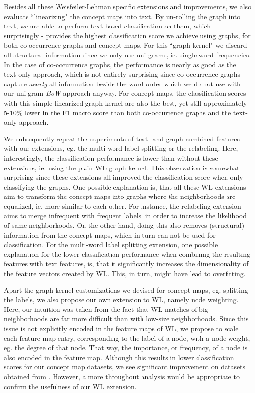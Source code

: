 Besides all these Weisfeiler-Lehman specific extensions and improvements, we also evaluate ``linearizing" the concept maps into text.
By un-rolling the graph into text, we are able to perform text-based classification on them, which - surprisingly - provides the highest classification score we achieve using graphs, for both co-occurrence graphs and concept maps.
For this ``graph kernel" we discard all structural information since we only use uni-grams, ie. single word frequencies.
In the case of co-occurrence graphs, the performance is nearly as good as the text-only approach, which is not entirely surprising since co-occurrence graphs capture \textit{nearly} all information beside the word order which we do not use with our uni-gram \textit{BoW} approach anyway.
For concept maps, the classification scores with this simple linearized graph kernel are also the best, yet still approximately 5-10\% lower in the F1 macro score than both co-occurrence graphs and the text-only approach.

We subsequently repeat the experiments of text- and graph combined features with our extensions, eg. the multi-word label splitting or the relabeling.
Here, interestingly, the classification performance is lower than without these extensions, ie. using the plain WL graph kernel.
This observation is somewhat surprising since these extensions all improved the classification score when only classifying the graphs.
One possible explanation is, that all these WL extensions aim to transform the concept maps into graphs where the neighborhoods are equalized, ie. more similar to each other.
For instance, the relabeling extension aims to merge infrequent with frequent labels, in order to increase the likelihood of same neighborhoods.
On the other hand, doing this also removes (structural) information from the concept maps, which in turn can not be used for  classification.
For the multi-word label splitting extension, one possible explanation for the lower classification performance when combining the resulting features with text features, is, that it significantly increases the dimensionality of the feature vectors created by WL.
This, in turn, might have lead to overfitting.

Apart the graph kernel customizations we devised for concept maps, eg. splitting the labels, we also propose our own extension to WL, namely node weighting.
Here, our intuition was taken from the fact that WL matches of big neighborhoods are far more difficult than with low-size neighborhoods.
Since this issue is not explicitly encoded in the feature maps of WL, we propose to scale each feature map entry, corresponding to the label of a node, with a node weight, eg. the degree of that node.
That way, the importance, or frequency, of a node is also encoded in the feature map.
Although this results in lower classification scores for our concept map datasets, we see significant improvement on datasets obtained from \cite{Kersting2016}.
However, a more throughout analysis would be appropriate to confirm the usefulness of our WL extension.

